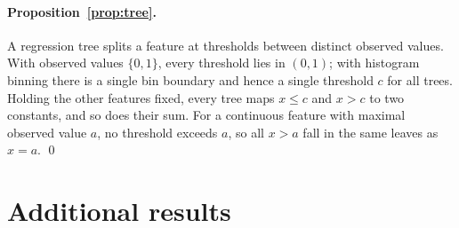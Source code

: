 \documentclass{article}
\theoremstyle{plain}
\theoremstyle{definition}
\theoremstyle{remark}
\begin{document}
\paragraph{Proposition~\ref{prop:tree}.} A regression tree splits a feature at thresholds between distinct observed values. With observed values $\{0,1\}$, every threshold lies in $(0,1)$; with histogram binning there is a single bin boundary and hence a single threshold $c$ for all trees. Holding the other features fixed, every tree maps $x\le c$ and $x>c$ to two constants, and so does their sum. For a continuous feature with maximal observed value $a$, no threshold exceeds $a$, so all $x>a$ fall in the same leaves as $x=a$. \qed

\section{Additional results}\label{app:extra}
\end{document}
